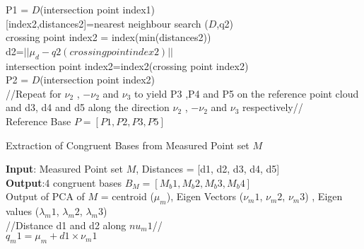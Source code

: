 \documentclass[12pt]{article}
\begin{document}
\begin{algorithm}[H]
P1 = $D$(intersection point index1)\\
\vspace{0.25cm}
[index2,distances2]=nearest neighbour search ($D$,q2)\\
crossing point index2 = index(min(distances2))\\
d2=$||\mu_d-q2(crossing point index2)||$\\
intersection point index2=index2(crossing point index2)\\
P2 = $D$(intersection point index2)\\
\vspace{0.25cm}
//Repeat for $\nu_2$ , $-\nu_2$ and $\nu_3$ to yield P3 ,P4 and P5 on the reference point cloud and d3, d4 and d5 along the direction $\nu_2$ , $-\nu_2$ and $\nu_3$ respectively// \\
\vspace{0.25cm}
Reference Base $P = [P1, P2, P3, P5]$\\
\end{algorithm}
\newpage
\begin{algorithm}[H]
\caption{Extraction of Congruent Bases from Measured Point set $M$}
\textbf{Input}: Measured Point set $M$, Distances = [d1, d2, d3, d4, d5]\\
\textbf{Output}:4 congruent bases $B_M = [M_b1,M_b2,M_b3,M_b4]$\\
\vspace{0.25cm}
Output of PCA of $M$ = centroid ($\mu_m$), Eigen Vectors ($\nu_m1$, $\nu_m2$, $\nu_m3$) , Eigen values ($\lambda_m1$, $\lambda_m2$, $\lambda_m3$)\\
\vspace{0.25cm}
//Distance d1 and d2 along $nu_m1$//\\
\vspace{0.25cm}
$q_m1 = \mu_m + d1 \times \nu_m1$\\





\end{algorithm}
\end{document}
